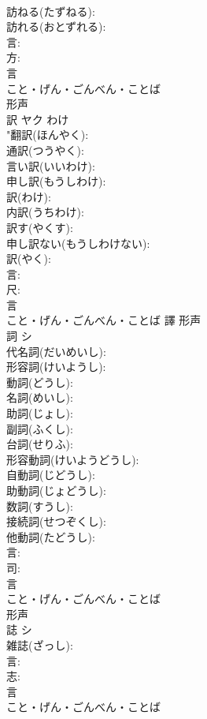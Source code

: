 \documentclass[8pt]{extreport}
\begin{document}
\begin{CJK}{UTF8}{min}
\\	訪ねる(たずねる): 
\\	訪れる(おとずれる): 
\\	言: 
\\	方: 
\\	言	
\\	こと・げん・ごんべん・ことば	
\\	形声 
\\	訳	ヤク	わけ		
\\	"翻訳(ほんやく): 
\\	通訳(つうやく): 
\\	言い訳(いいわけ): 
\\	申し訳(もうしわけ): 
\\	訳(わけ): 
\\	内訳(うちわけ): 
\\	訳す(やくす): 
\\	申し訳ない(もうしわけない): 
\\	訳(やく): 
\\	言: 
\\	尺: 
\\	言	
\\	こと・げん・ごんべん・ことば	譯	形声 
\\	詞	シ			
\\	代名詞(だいめいし): 
\\	形容詞(けいようし): 
\\	動詞(どうし): 
\\	名詞(めいし): 
\\	助詞(じょし): 
\\	副詞(ふくし): 
\\	台詞(せりふ): 
\\	形容動詞(けいようどうし): 
\\	自動詞(じどうし): 
\\	助動詞(じょどうし): 
\\	数詞(すうし): 
\\	接続詞(せつぞくし): 
\\	他動詞(たどうし): 
\\	言: 
\\	司: 
\\	言	
\\	こと・げん・ごんべん・ことば	
\\	形声 
\\	誌	シ			
\\	雑誌(ざっし): 
\\	言: 
\\	志: 
\\	言	
\\	こと・げん・ごんべん・ことば	

\end{CJK}
\end{document}
